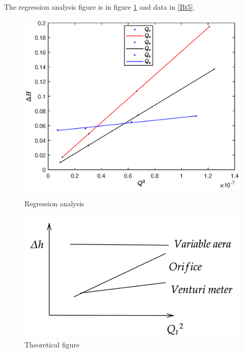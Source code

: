 The regression analysis figure is in figure \ref{Bf4} and data in \ref{Bt5}.
\begin{figure}[h]
\begin{minipage}[h]{0.65\textwidth}

        \centering
        \includegraphics[scale=0.75]{Results/B.eps}
        \caption{Regression analysis}
        \label{Bf4}

\end{minipage}
\begin{minipage}{0.44\textwidth}

        \centering
        \includegraphics[scale=0.45]{Results/BB.png}
        \caption{Theoretical figure}
        \label{Bf4}
\end{minipage}
    
\end{figure}













